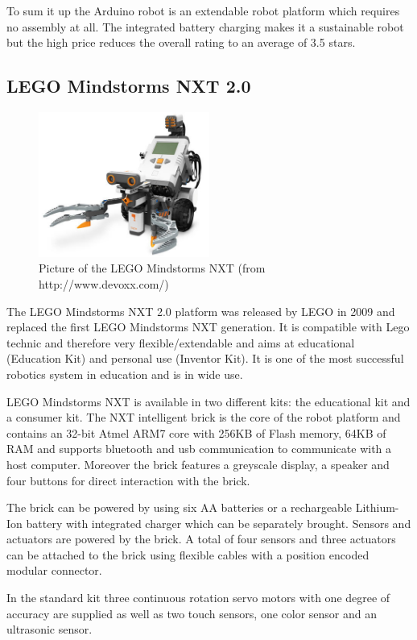 \documentclass[11pt,a4paper]{article}
\begin{document}
To sum it up the Arduino robot is an extendable robot platform which requires no assembly at all. The integrated battery charging makes it a sustainable robot but the high price reduces the overall rating to an average of 3.5 stars.

\subsection{LEGO Mindstorms NXT 2.0}
\begin{figure}[h!]
  \centering
  \includegraphics[width=0.5\textwidth]{images/mindstorms.jpg}
  \caption{Picture of the LEGO Mindstorms NXT (from http://www.devoxx.com/)}
\end{figure}

The LEGO Mindstorms NXT 2.0 platform was released by LEGO in 2009 and replaced the first LEGO Mindstorms NXT generation. It is compatible with Lego technic and therefore very flexible/extendable and aims at educational (Education Kit) and personal use (Inventor Kit). It is one of the most successful robotics system in education and is in wide use.

LEGO Mindstorms NXT is available in two different kits: the educational kit and a consumer kit. The NXT intelligent brick is the core of the robot platform and contains an 32-bit Atmel ARM7 core with 256KB of Flash memory, 64KB of RAM and supports bluetooth and usb communication to communicate with a host computer. Moreover the brick features a greyscale display, a speaker and four buttons for direct interaction with the brick.

The brick can be powered by using six AA batteries or a rechargeable Lithium-Ion battery with integrated charger which can be separately brought. Sensors and actuators are powered by the brick. A total of four sensors and three actuators can be attached to the brick using flexible cables with a position encoded modular connector.

In the standard kit three continuous rotation servo motors with one degree of accuracy are supplied as well as two touch sensors, one color sensor and an ultrasonic sensor. 
\end{document}
